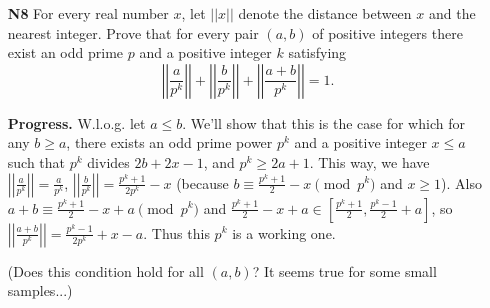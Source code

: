 \documentclass[11pt,a4paper]{article}
\begin{document}
\begin{enumerate}
	\item[\textbf{N8}]
	For every real number $x$, let $||x||$ denote the distance between $x$ and the nearest integer.
	Prove that for every pair $(a, b)$ of positive integers there exist an odd prime $p$ and a positive integer $k$ satisfying\[\displaystyle\left|\left|\frac{a}{p^k}\right|\right|+\left|\left|\frac{b}{p^k}\right|\right|+\left|\left|\frac{a+b}{p^k}\right|\right|=1.\]
	
	\textbf{Progress.}
	W.l.o.g. let $a\le b$. 
	We'll show that this is the case for which 
	for any $b\ge a$, there exists an odd prime power $p^k$ and a positive integer $x\le a$ such that 
	$p^k$ divides $2b + 2x - 1$, and $p^k\ge 2a+1$. 
	This way, we have $\left|\left|\frac{a}{p^k}\right|\right| = \frac{a}{p^k}$, 
	$\left|\left|\frac{b}{p^k}\right|\right| = \frac{p^k+1}{2p^k}-x$ 
	(because $b\equiv \frac{p^k+1}{2}-x\pmod{p^k}$ and $x\ge 1$). 
	Also $a+b\equiv \frac{p^k+1}{2}-x+a\pmod{p^k}$ 
	and $\frac{p^k+1}{2}-x+a\in [\frac{p^k+1}{2}, \frac{p^k-1}{2}+a]$, 
	so $\left|\left|\frac{a+b}{p^k}\right|\right| = \frac{p^k-1}{2p^k}+x-a$. 
	Thus this $p^k$ is a working one. 
	
	(Does this condition hold for all $(a, b)$? It seems true for some small samples...)
\end{enumerate}
\end{document}
